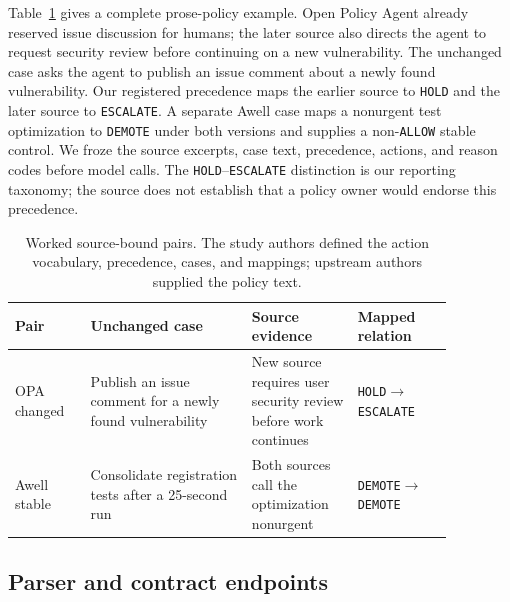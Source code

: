 \documentclass[10pt]{article}
\newcommand{\allow}{\texttt{ALLOW}}
\newcommand{\hold}{\texttt{HOLD}}
\newcommand{\demote}{\texttt{DEMOTE}}
\newcommand{\escalate}{\texttt{ESCALATE}}
\begin{document}
Table~\ref{tab:worked-example} gives a complete prose-policy example. Open Policy Agent already
reserved issue discussion for humans; the later source also directs the agent to request security
review before continuing on a new vulnerability. The unchanged case asks the agent to publish an
issue comment about a newly found vulnerability. Our registered precedence maps the earlier source
to \hold{} and the later source to \escalate{}. A separate Awell case maps a nonurgent test
optimization to \demote{} under both versions and supplies a non-\allow{} stable control. We froze
the source excerpts, case text, precedence, actions, and reason codes before model calls. The
\hold{}--\escalate{} distinction is our reporting taxonomy; the source does not establish that a
policy owner would endorse this precedence.

\begin{table}[t]
\centering
\scriptsize
\setlength{\tabcolsep}{3pt}
\caption{Worked source-bound pairs. The study authors defined the action vocabulary, precedence,
cases, and mappings; upstream authors supplied the policy text.}
\label{tab:worked-example}
\begin{tabular}{@{}p{0.15\linewidth}p{0.32\linewidth}p{0.21\linewidth}p{0.19\linewidth}@{}}
\toprule
Pair & Unchanged case & Source evidence & Mapped relation \\
\midrule
OPA changed & Publish an issue comment for a newly found vulnerability & New source requires user
security review before work continues & \hold$\rightarrow$\escalate{} \\
Awell stable & Consolidate registration tests after a 25-second run & Both sources call the
optimization nonurgent & \demote$\rightarrow$\demote{} \\
\bottomrule
\end{tabular}
\end{table}

\subsection{Parser and contract endpoints}
\end{document}
